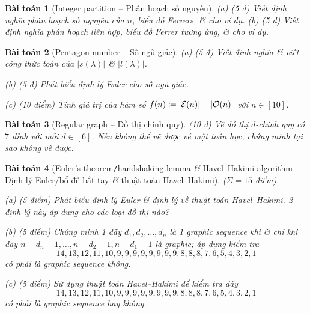 \documentclass{article}
\newtheorem{baitoan}{Bài toán}
\begin{document}
\begin{baitoan}[Integer partition -- Phân hoạch số nguyên]
	(a) \emph{(5 đ)} Viết định nghĩa phân hoạch số nguyên của $n$, biểu đồ Ferrers, \& cho ví dụ. (b) \emph{(5 đ)} Viết định nghĩa phân hoạch liên hợp, biểu đồ Ferrer tương ứng, \& cho ví dụ.	
\end{baitoan}

\begin{baitoan}[Pentagon number -- Số ngũ giác]
	(a) \emph{(5 đ)} Viết định nghĩa \& viết công thức toán của $|s(\lambda)|$ \& $|l(\lambda)|$.
	\item(b) \emph{(5 đ)} Phát biểu định lý Euler cho số ngũ giác.
	\item(c) \emph{(10 điểm)} Tính giá trị của hàm số $f(n)\coloneqq|{\cal E}(n)| - |{\cal O}(n)|$ với $n\in[10]$.
\end{baitoan}

\begin{baitoan}[Regular graph -- Đồ thị chính quy]
	\emph{(10 đ)} Vẽ đồ thị $d$-chính quy có $7$ đỉnh với mỗi $d\in[6]$. Nếu không thể vẽ được về mặt toán học, chứng minh tại sao không vẽ được.
\end{baitoan}

\begin{baitoan}[Euler's theorem{\tt/}handshaking lemma {\it\&} Havel--Hakimi algorithm -- Định lý Euler/bổ đề bắt tay {\it\&} thuật toán Havel--Hakimi]
	{\rm($\Sigma = 15$ điểm)}
	\item(a) {\rm(5 điểm)} Phát biểu định lý Euler \& định lý về thuật toán Havel--Hakimi. 2 định lý này áp dụng cho các loại đồ thị nào?
	\item(b) {\rm(5 điểm) \cite[P10.1.13, p. 368]{Shahriari2022}} Chứng minh 1 dãy $d_1,d_2,\ldots,d_n$ là 1 graphic sequence khi \& chỉ khi dãy $n - d_n - 1,\ldots,n - d_2 - 1,n - d_1 - 1$ là graphic; áp dụng kiểm tra
	\begin{equation*}
		14,13,12,11,10,9,9,9,9,9,9,9,9,8,8,8,7,6,5,4,3,2,1
	\end{equation*}
	có phải là graphic sequence không.
	\item(c) {\rm(5 điểm)} Sử dụng thuật toán Havel--Hakimi để kiểm tra dãy
	\begin{equation*}
		14,13,12,11,10,9,9,9,9,9,9,9,9,8,8,8,7,6,5,4,3,2,1
	\end{equation*}
	có phải là graphic sequence hay không.
\end{baitoan}
\end{document}
